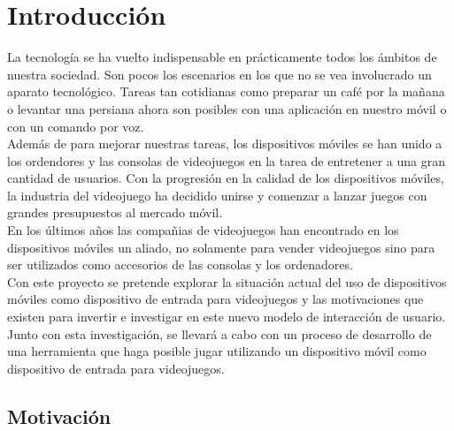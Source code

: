%
%

\chapter{Introducci\'on}

La tecnolog\'ia se ha vuelto indispensable en pr\'acticamente todos los \'ambitos de nuestra sociedad. Son pocos los escenarios  en los que no se vea involucrado un aparato tecnol\'ogico. Tareas tan cotidianas como preparar un caf\'e por la ma\~nana o levantar una persiana ahora son posibles con una aplicaci\'on en nuestro m\'ovil o con un comando por voz. \\

Adem\'as de para mejorar nuestras tareas, los dispositivos m\'oviles se han unido a los ordendores y las consolas de videojuegos en la tarea de entretener a una gran cantidad de usuarios. Con la progresi\'on en la calidad de los dispositivos m\'oviles, la industria del videojuego ha decidido unirse y comenzar a lanzar juegos con grandes presupuestos al mercado m\'ovil. \\

En los \'ultimos a\~nos las compa\~nias de videojuegos han encontrado en los dispositivos m\'oviles un aliado, no solamente para vender videojuegos sino para ser utilizados como accesorios de las consolas y los ordenadores. \\


Con este proyecto se pretende explorar la situaci\'on actual del uso de dispositivos m\'oviles como dispositivo de entrada para videojuegos y las motivaciones que existen para invertir e investigar en este nuevo modelo de interacci\'on de usuario. Junto con esta investigaci\'on, se llevar\'a a cabo con un proceso de desarrollo de una herramienta que haga posible jugar utilizando un dispositivo m\'ovil como dispositivo de entrada para videojuegos.


\section{Motivaci\'on}

